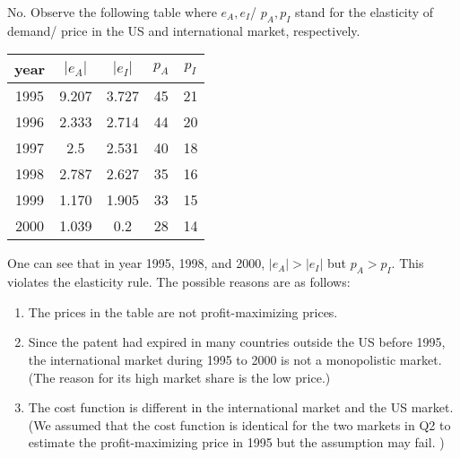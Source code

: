 \documentclass[a4paper]{article}
\begin{document}
    \begin{answer}[Q4]
    
    No. Observe the following table where $e_A, e_I$/ $p_A, p_I$ stand for the elasticity of demand/ price in the US and international market, respectively. 
    \begin{center}
    \begin{tabular}{||c c c c c||} 
     \hline
     year & $|e_A|$ & $|e_I|$ & $p_A$ & $p_I$ \\ [0.8 ex] 
     \hline\hline
     1995 & 9.207 & 3.727 & 45 & 21 \\ 
     \hline
     1996 & 2.333 & 2.714 & 44 & 20 \\
     \hline
     1997 & 2.5 & 2.531 & 40 & 18 \\
     \hline
     1998 & 2.787 & 2.627 & 35 & 16 \\
     \hline
     1999 & 1.170 & 1.905 & 33 & 15 \\ 
     \hline
     2000 & 1.039 & 0.2 & 28 & 14 \\ 
     \hline
    \end{tabular}
    \end{center}
    One can see that in year 1995, 1998, and 2000, $|e_A| > |e_I|$ but $p_A > p_I$. This violates the elasticity rule. The possible reasons are as follows:
    \begin{enumerate}
        \item The prices in the table are not profit-maximizing prices. 
        \item Since the patent had expired in many countries outside the US before 1995, the international market during 1995 to 2000 is not a monopolistic market. (The reason for its high market share is the low price.)
        \item The cost function is different in the international market and the US market. (We assumed that the cost function is identical for the two markets in Q2 to estimate the profit-maximizing price in 1995 but the assumption may fail. )
    \end{enumerate}
    \end{answer}
    
\end{document}
